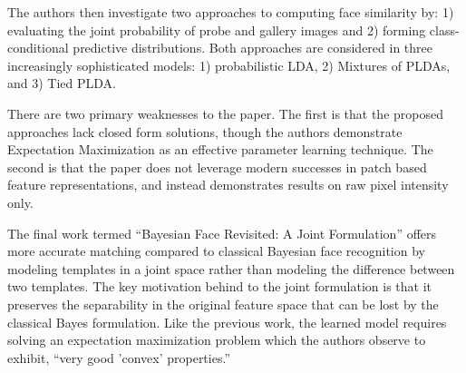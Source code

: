\documentclass[12pt]{article}
\begin{document}
The authors then investigate two approaches to computing face similarity by: 1) evaluating the joint probability of probe and gallery images and 2) forming class-conditional predictive distributions.
Both approaches are considered in three increasingly sophisticated models: 1) probabilistic LDA, 2) Mixtures of PLDAs, and 3) Tied PLDA.
\par
There are two primary weaknesses to the paper.
The first is that the proposed approaches lack closed form solutions, though the authors demonstrate Expectation Maximization as an effective parameter learning technique.
The second is that the paper does not leverage modern successes in patch based feature representations, and instead demonstrates results on raw pixel intensity only.
\par
The final work termed ``Bayesian Face Revisited: A Joint Formulation'' offers more accurate matching compared to classical Bayesian face recognition by modeling templates in a joint space rather than modeling the difference between two templates. The key motivation behind to the joint formulation is that it preserves the separability in the original feature space that can be lost by the classical Bayes formulation. Like the previous work, the learned model requires solving an expectation maximization problem which the authors observe to exhibit, ``very good 'convex' properties.'' 
 
\end{document}
